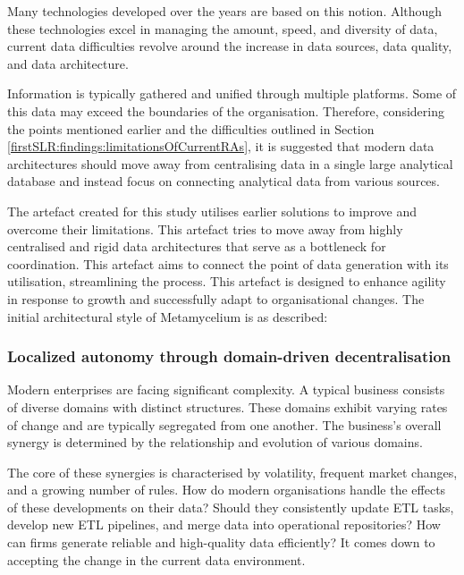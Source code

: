 \documentclass[journal]{IEEEtran}
\begin{document}
Many technologies developed over the years are based on this notion. Although these technologies excel in managing the amount, speed, and diversity of data, current data difficulties revolve around the increase in data sources, data quality, and data architecture. 





Information is typically gathered and unified through multiple platforms. Some of this data may exceed the boundaries of the organisation. Therefore, considering the points mentioned earlier and the difficulties outlined in Section \ref{firstSLR:findings:limitationsOfCurrentRAs}, it is suggested that modern data architectures should move away from centralising data in a single large analytical database and instead focus on connecting analytical data from various sources. 

The artefact created for this study utilises earlier solutions to improve and overcome their limitations. This artefact tries to move away from highly centralised and rigid data architectures that serve as a bottleneck for coordination. This artefact aims to connect the point of data generation with its utilisation, streamlining the process. This artefact is designed to enhance agility in response to growth and successfully adapt to organisational changes. The initial architectural style of Metamycelium is as described: 


\subsubsection{Localized autonomy through domain-driven decentralisation}

Modern enterprises are facing significant complexity. A typical business consists of diverse domains with distinct structures. These domains exhibit varying rates of change and are typically segregated from one another. The business's overall synergy is determined by the relationship and evolution of various domains. 

The core of these synergies is characterised by volatility, frequent market changes, and a growing number of rules. How do modern organisations handle the effects of these developments on their data? Should they consistently update ETL tasks, develop new ETL pipelines, and merge data into operational repositories? How can firms generate reliable and high-quality data efficiently? It comes down to accepting the change in the current data environment. 
\end{document}
